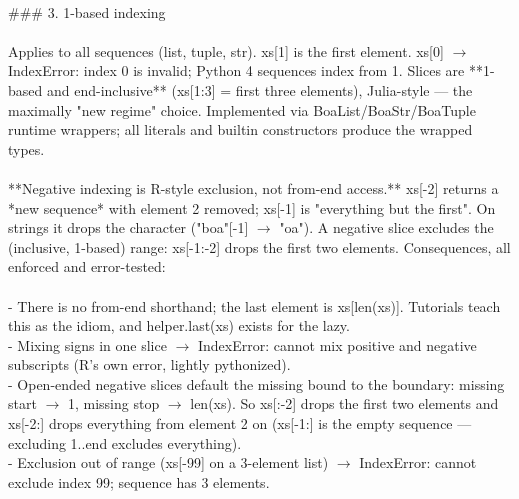 \begin{exbox}
{  \  \\
  \#\#\# 3. 1-based indexing \\
  \  \\
  Applies to all sequences (list, tuple, str). \textasciigrave{}xs[1]\textasciigrave{} is the first element. \textasciigrave{}xs[0]\textasciigrave{} $\rightarrow$ \textasciigrave{}IndexError: index 0 is invalid; Python 4 sequences index from 1\textasciigrave{}. Slices are **1-based and end-inclusive** (\textasciigrave{}xs[1:3]\textasciigrave{} = first three elements), Julia-style --- the maximally "new regime" choice. Implemented via \textasciigrave{}BoaList\textasciigrave{}/\textasciigrave{}BoaStr\textasciigrave{}/\textasciigrave{}BoaTuple\textasciigrave{} runtime wrappers; all literals and builtin constructors produce the wrapped types. \\
  \  \\
  {}**Negative indexing is R-style exclusion, not from-end access.** \textasciigrave{}xs[-2]\textasciigrave{} returns a *new sequence* with element 2 removed; \textasciigrave{}xs[-1]\textasciigrave{} is "everything but the first". On strings it drops the character (\textasciigrave{}"boa"[-1]\textasciigrave{} $\rightarrow$ \textasciigrave{}"oa"\textasciigrave{}). A negative slice excludes the (inclusive, 1-based) range: \textasciigrave{}xs[-1:-2]\textasciigrave{} drops the first two elements. Consequences, all enforced and error-tested: \\
  \  \\
  - There is no from-end shorthand; the last element is \textasciigrave{}xs[len(xs)]\textasciigrave{}. Tutorials teach this as the idiom, and \textasciigrave{}helper.last(xs)\textasciigrave{} exists for the lazy. \\
  - Mixing signs in one slice $\rightarrow$ \textasciigrave{}IndexError: cannot mix positive and negative subscripts\textasciigrave{} (R's own error, lightly pythonized). \\
  - Open-ended negative slices default the missing bound to the boundary: missing start $\rightarrow$ 1, missing stop $\rightarrow$ \textasciigrave{}len(xs)\textasciigrave{}. So \textasciigrave{}xs[:-2]\textasciigrave{} drops the first two elements and \textasciigrave{}xs[-2:]\textasciigrave{} drops everything from element 2 on (\textasciigrave{}xs[-1:]\textasciigrave{} is the empty sequence --- excluding 1..end excludes everything). \\
  - Exclusion out of range (\textasciigrave{}xs[-99]\textasciigrave{} on a 3-element list) $\rightarrow$ \textasciigrave{}IndexError: cannot exclude index 99; sequence has 3 elements\textasciigrave{}. \\
}
\end{exbox}
